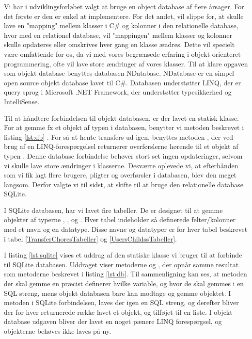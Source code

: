 Vi har i udviklingsforløbet valgt at bruge en object database af flere årsager. For det første er den er enkel at implementere. For det andet, vil slippe for, at skulle lave en "mapping" mellem klasser i C\# og kolonner i den relationelle database, hvor med en relationel database, vil "mappingen" mellem klasser og kolonner skulle opdateres eller omskrives hver gang en klasse ændres. Dette vil specielt være omfattende for os, da vi med vores begrænsede erfaring i objekt orienteret programmering, ofte vil lave store ændringer af vores klasser.
Til at klare opgaven som objekt database benyttes databasen NDatabase. NDatabase er en simpel open source objekt database lavet til C\#. Databasen understøtter LINQ, der er query sprog i Microsoft .NET Framework, der understøtter typesikkerhed og IntelliSense\cite{linqdok}.

Til at håndtere forbindelsen til objekt databasen, er der lavet en statisk klasse. For at gemme fx et objekt af typen  i databasen, benytter vi  metoden beskrevet i listing \ref{lst:db} . For så at hente transfers ud igen, benyttes metoden , der ved brug af en LINQ-forespørgelsel returnerer overførslerne hørende til et objekt af typen . Denne database forbindelse behøver stort set ingen opdateringer, selvom vi skulle lave store ændringer i klasserne.
Desværre oplevede vi, at efterhånden som vi fik lagt flere brugere, pligter og overførsler i databasen, blev den meget langsom. Derfor valgte vi til sidst, at skifte til at bruge den relationelle database SQLite.


I SQLite databasen, har vi lavet fire tabeller. De er designet til at gemme objekter af typerne , ,  og . Hver tabel indeholder så definerede felter/kolonner med et navn og en datatype. Disse navne og datatyper er for hver tabel beskrevet i tabel \ref{TransferChoresTabeller} og \ref{UsersChildssTabeller}. 

I listing \ref{lst:sqlite} vises et uddrag af den statiske klasse vi bruger til at forbinde til SQLite databasen. Uddraget viser metoderne  og , der opnår samme resultat som metoderne beskrevet i listing \ref{lst:db}. Til sammenligning kan ses, at metoden der skal gemme en  præcist definerer hvilke variable, og hvor de skal gemmes i en SQL streng, mens objekt databasen bare kan modtage og gemme objektet. I  metoden i SQLite forbindelsen, laves der igen en SQL streng, og derefter bliver der for hver returnerede række lavet et objekt, og tilføjet til en liste. I objekt database udgaven bliver der lavet en noget pænere LINQ forespørgsel, og objekterne behøves ikke laves på ny.

